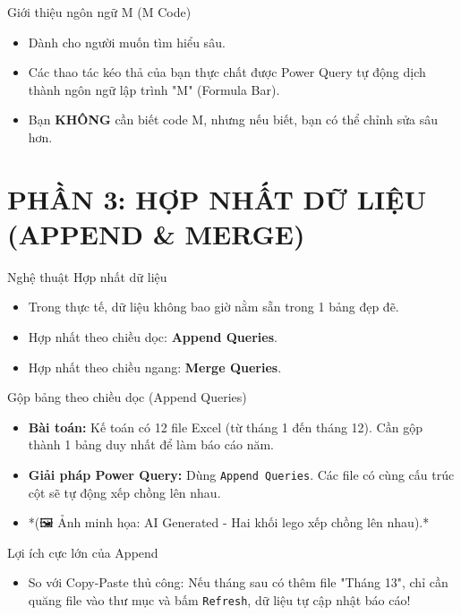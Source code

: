\documentclass[aspectratio=169]{beamer}
\begin{document}
\begin{frame}{Giới thiệu ngôn ngữ M (M Code)}
    \begin{itemize}
        \item Dành cho người muốn tìm hiểu sâu.
        \item Các thao tác kéo thả của bạn thực chất được Power Query tự động dịch thành ngôn ngữ lập trình "M" (Formula Bar).
        \item Bạn \textbf{KHÔNG} cần biết code M, nhưng nếu biết, bạn có thể chỉnh sửa sâu hơn.
    \end{itemize}
\end{frame}


\section{PHẦN 3: HỢP NHẤT DỮ LIỆU (APPEND \& MERGE)}


\begin{frame}{Nghệ thuật Hợp nhất dữ liệu}
    \begin{itemize}
        \item Trong thực tế, dữ liệu không bao giờ nằm sẵn trong 1 bảng đẹp đẽ.
        \item Hợp nhất theo chiều dọc: \textbf{Append Queries}.
        \item Hợp nhất theo chiều ngang: \textbf{Merge Queries}.
    \end{itemize}
\end{frame}


\begin{frame}{Gộp bảng theo chiều dọc (Append Queries)}
    \begin{itemize}
        \item \textbf{Bài toán:} Kế toán có 12 file Excel (từ tháng 1 đến tháng 12). Cần gộp thành 1 bảng duy nhất để làm báo cáo năm.
        \item \textbf{Giải pháp Power Query:} Dùng \texttt{Append Queries}. Các file có cùng cấu trúc cột sẽ tự động xếp chồng lên nhau.
        \item *(🖼️ Ảnh minh họa: AI Generated - Hai khối lego xếp chồng lên nhau).*
    \end{itemize}
\end{frame}


\begin{frame}{Lợi ích cực lớn của Append}
    \begin{itemize}
        \item So với Copy-Paste thủ công: Nếu tháng sau có thêm file "Tháng 13", chỉ cần quăng file vào thư mục và bấm \texttt{Refresh}, dữ liệu tự cập nhật báo cáo!
    \end{itemize}
\end{frame}
\end{document}
